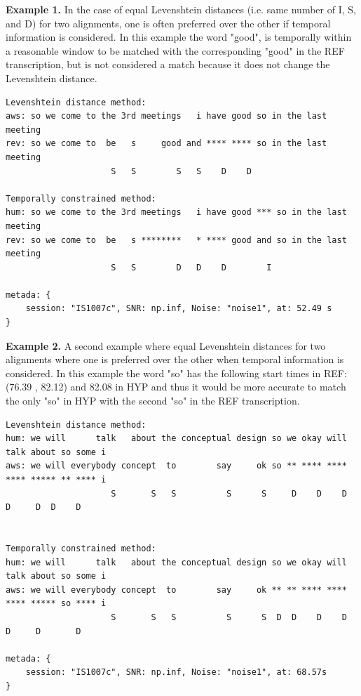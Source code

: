 \documentclass{article}
\begin{document}
\textbf{Example 1.} In the case of equal Levenshtein distances (i.e. same number of I, S, and D) for two alignments, one is often preferred over the other if temporal information is considered. In this example the word "good", is temporally within a reasonable window to be matched with the corresponding "good" in the REF transcription, but is not considered a match because it does not change the Levenshtein distance.
\hfil

\begin{verbatim}
Levenshtein distance method:
aws: so we come to the 3rd meetings   i have good so in the last meeting
rev: so we come to  be   s     good and **** **** so in the last meeting
                     S   S        S   S    D    D   

Temporally constrained method:
hum: so we come to the 3rd meetings   i have good *** so in the last meeting
rev: so we come to  be   s ********   * **** good and so in the last meeting
                     S   S        D   D    D        I 

metada: {
    session: "IS1007c", SNR: np.inf, Noise: "noise1", at: 52.49 s
}
\end{verbatim}

\textbf{Example 2.} A second example where equal Levenshtein distances for two alignments where one is preferred over the other when temporal information is considered. In this example the word "so" has the following start times in REF: (76.39 , 82.12) and 82.08 in HYP and thus it would be more accurate to match the only "so" in HYP with the second "so" in the REF transcription. 
\begin{verbatim}
Levenshtein distance method:
hum: we will      talk   about the conceptual design so we okay will talk about so some i
aws: we will everybody concept  to        say     ok so ** **** **** **** ***** ** **** i
                     S       S   S          S      S     D    D    D    D     D  D    D  


Temporally constrained method:
hum: we will      talk   about the conceptual design so we okay will talk about so some i
aws: we will everybody concept  to        say     ok ** ** **** **** **** ***** so **** i
                     S       S   S          S      S  D  D    D    D    D     D       D 

metada: {
    session: "IS1007c", SNR: np.inf, Noise: "noise1", at: 68.57s
}
\end{verbatim}
\end{document}
